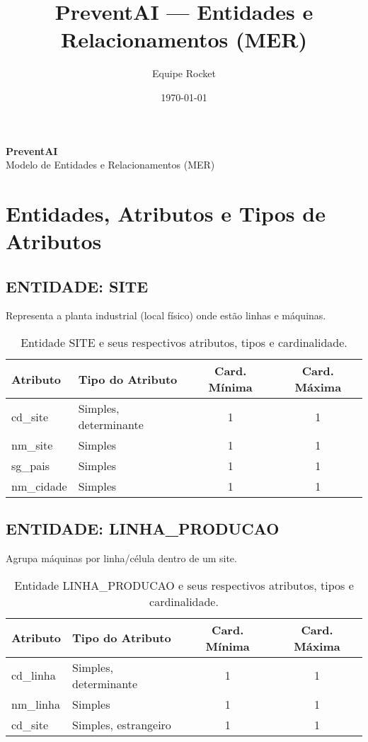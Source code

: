 \documentclass[10pt,a4paper]{article}
\title{PreventAI — Entidades e Relacionamentos (MER)}
\author{Equipe Rocket}
\date{\today}
\begin{document}

\begin{center}
    \large{\textbf{PreventAI}} \\
    \normalsize{Modelo de Entidades e Relacionamentos (MER)} \\
\end{center}
\vspace{1cm}

\section*{Entidades, Atributos e Tipos de Atributos}

\subsection*{ENTIDADE: SITE}
Representa a planta industrial (local físico) onde estão linhas e máquinas.

\begin{table}[h!]
\centering
\begin{tabular}{| l | l | c | c |}
\hline
\rowcolor{red}\color{white}\textbf{Atributo} & \color{white}\textbf{Tipo do Atributo} & \color{white}\textbf{Card. Mínima} & \color{white}\textbf{Card. Máxima} \\
\hline
cd\_site & Simples, determinante & 1 & 1 \\
nm\_site & Simples & 1 & 1 \\
sg\_pais & Simples & 1 & 1 \\
nm\_cidade & Simples & 1 & 1 \\
\hline
\end{tabular}
\caption{Entidade SITE e seus respectivos atributos, tipos e cardinalidade.}
\label{tab:site}
\end{table}

\subsection*{ENTIDADE: LINHA\_PRODUCAO}
Agrupa máquinas por linha/célula dentro de um site.

\begin{table}[h!]
\centering
\begin{tabular}{| l | l | c | c |}
\hline
\rowcolor{red}\color{white}\textbf{Atributo} & \color{white}\textbf{Tipo do Atributo} & \color{white}\textbf{Card. Mínima} & \color{white}\textbf{Card. Máxima} \\
\hline
cd\_linha & Simples, determinante & 1 & 1 \\
nm\_linha & Simples & 1 & 1 \\
cd\_site & Simples, estrangeiro & 1 & 1 \\
\hline
\end{tabular}
\caption{Entidade LINHA\_PRODUCAO e seus respectivos atributos, tipos e cardinalidade.}
\label{tab:linha_producao}
\end{table}
\end{document}

